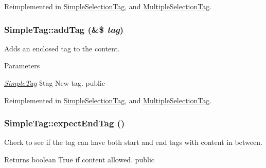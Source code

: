 Reimplemented in \hyperlink{class_simple_selection_tag_a168eec24b5c2d95c4e7e0eebfca9f4d7}{SimpleSelectionTag}, and \hyperlink{class_multiple_selection_tag_a189718260cdafedf3038e7aa9cdcf381}{MultipleSelectionTag}.\hypertarget{class_simple_tag_a5f5cc331c052dd6eb0bd104f68143c76}{
\subsubsection[{addTag}]{\setlength{\rightskip}{0pt plus 5cm}SimpleTag::addTag (\&\$ {\em tag})}}
\label{class_simple_tag_a5f5cc331c052dd6eb0bd104f68143c76}
Adds an enclosed tag to the content. 
\begin{DoxyParams}{Parameters}
\item[{\em \hyperlink{class_simple_tag}{SimpleTag}}]\$tag New tag.  public \end{DoxyParams}


Reimplemented in \hyperlink{class_simple_selection_tag_aa7547a0f3b171987ad686049822a1446}{SimpleSelectionTag}, and \hyperlink{class_multiple_selection_tag_a3dff5d342339cf7f4d07acc3826e807f}{MultipleSelectionTag}.\hypertarget{class_simple_tag_a158fcbf8b82e7a6f7b6855c1dbe0715b}{
\subsubsection[{expectEndTag}]{\setlength{\rightskip}{0pt plus 5cm}SimpleTag::expectEndTag ()}}
\label{class_simple_tag_a158fcbf8b82e7a6f7b6855c1dbe0715b}
Check to see if the tag can have both start and end tags with content in between. \begin{DoxyReturn}{Returns}
boolean True if content allowed.  public 
\end{DoxyReturn}


